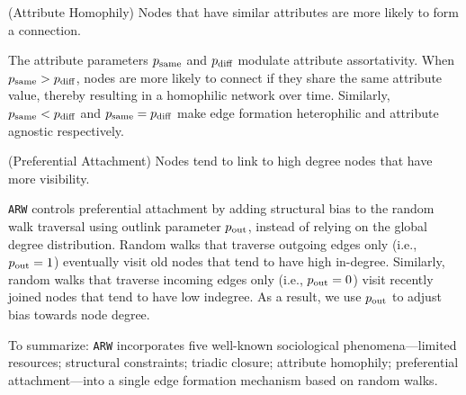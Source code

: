 \begin{ph}
	(Attribute Homophily) Nodes that have similar attributes are more likely
	to form a connection. \cite{mcpherson2001birds}
\end{ph}
The attribute parameters $p_{\scriptsize\mbox{same}}$ and $p_{\scriptsize\mbox{diff}}$ modulate
attribute assortativity. When $p_{\scriptsize\mbox{same}} > p_{\scriptsize\mbox{diff}}$, nodes are more likely to connect if they share
the same attribute value, thereby resulting in a homophilic network over time. Similarly,
$p_{\scriptsize\mbox{same}} < p_{\scriptsize\mbox{diff}}$ and $p_{\scriptsize\mbox{same}}=p_{\scriptsize\mbox{diff}}$ make edge formation heterophilic and attribute agnostic respectively.

\begin{ph}
	(Preferential Attachment) Nodes tend to link to high degree nodes that have more
	visibility. \cite{barabasi1999emergence}
\end{ph}
\texttt{ARW} controls preferential attachment by adding structural bias to the
random walk traversal using outlink parameter $p_{\scriptsize\mbox{out}}$, instead of relying on the
global degree distribution. Random walks that traverse outgoing edges only
(i.e., $p_{\scriptsize\mbox{out}} =1$) eventually visit old nodes that tend to have high in-degree.
Similarly, random walks that traverse incoming edges only (i.e., $p_{\scriptsize\mbox{out}}=0$) visit
recently joined nodes that tend to have low indegree. As a result, we use
$p_{\scriptsize\mbox{out}}$ to adjust bias towards node degree.

To summarize: \texttt{ARW} incorporates five well-known sociological
phenomena---limited resources; structural constraints; triadic closure;
attribute homophily; preferential attachment---into a single edge formation
mechanism based on random walks.


